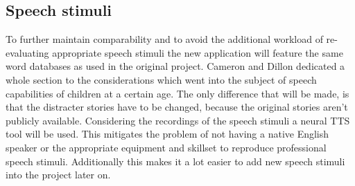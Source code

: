 \documentclass[a4paper,11pt]{article}%
\renewcommand{\\}{\vspace*{0.5\baselineskip} \newline}
\begin{document}


\subsection{Speech stimuli}
\label{sec:speech}
To further maintain comparability and to avoid the additional workload of re-evaluating appropriate speech stimuli the new application will feature the same word databases as used in the original project. Cameron and Dillon dedicated a whole section to the considerations which went into the subject of speech capabilities of children at a certain age. The only difference that will be made, is that the distracter stories have to be changed, because the original stories aren't publicly available.
\newline
\newline
Considering the recordings of the speech stimuli a neural \ac{TTS} tool will be used. This mitigates the problem of not having a native English speaker or the appropriate equipment and skillset to reproduce professional speech stimuli. Additionally this makes it a lot easier to add new speech stimuli into the project later on.


\end{document}
